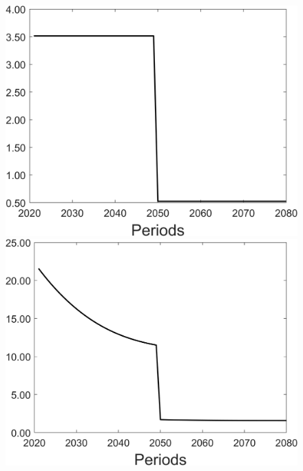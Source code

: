 \begin{figure}[h!!]
\begin{minipage}[]{0.32\textwidth}
	\end{minipage}
	\begin{minipage}[]{0.32\textwidth}
		\includegraphics[width=1\textwidth]{../../codding_model/Own/figures/Rep_agent/staticonlyRam_separate_yd_periods59_eppsilon4.00_zeta1.40_Ad08_Ac04_thetac0.70_thetad0.56_HetGrowth1_tauul0.181_util0_withtarget1_lgd0.png}
	\end{minipage}
	\begin{minipage}[]{0.32\textwidth}
		\includegraphics[width=1\textwidth]{../../codding_model/Own/figures/Rep_agent/staticonlyRam_separate_xd_periods59_eppsilon4.00_zeta1.40_Ad08_Ac04_thetac0.70_thetad0.56_HetGrowth1_tauul0.181_util0_withtarget1_lgd0.png}

\end{minipage}
\end{figure}
